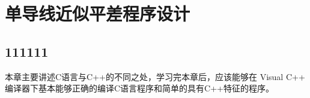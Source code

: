 ﻿%

\chapter{单导线近似平差程序设计}
\section{111111}
本章主要讲述C语言与C++的不同之处，学习完本章后，应该能够在 Visual C++
编译器下基本能够正确的编译C语言程序和简单的具有C++特征的程序。

 
